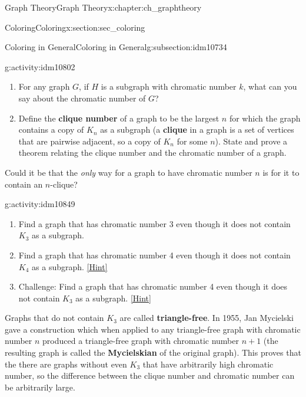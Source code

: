 \documentclass[oneside,10pt,]{book}
\newcommand{\terminology}[1]{\textbf{#1}}
\numberwithin{equation}{chapter}
\newcommand{\vtx}[2]{node[fill,circle,inner sep=0pt, minimum size=4pt,label=#1:#2]{}}
\renewcommand{\v}{\vtx{above}{}}
\begin{document}
\begin{chapterptx}{Graph Theory}{}{Graph Theory}{}{}{x:chapter:ch_graphtheory}
\begin{sectionptx}{Coloring}{}{Coloring}{}{}{x:section:sec_coloring}
\begin{subsectionptx}{Coloring in General}{}{Coloring in General}{}{}{g:subsection:idm10734}
\begin{activity}{}{g:activity:idm10802}
\begin{enumerate}[font=\bfseries,label=(\alph*),ref=\alph*]
\begin{sidebyside}{1}{0.375}{0.375}{0}
\begin{sbspanel}{0.25}
{
}%
\end{sbspanel}%
\end{sidebyside}%
\space\hspace*{0pt}\hfill{\tiny\hyperlink{g:hint:idm10809-back}{[Hint]}}\item{}For any graph \(G\), if \(H\) is a subgraph with chromatic number \(k\), what can you say about the chromatic number of \(G\)?%
\item{}Define the \terminology{clique number} of a graph to be the largest \(n\) for which the graph contains a copy of \(K_n\) as a subgraph (a \terminology{clique} in a graph is a set of vertices that are pairwise adjacent, so a copy of \(K_n\) for some \(n\)).  State and prove a theorem relating the clique number and the chromatic number of a graph.%
\end{enumerate}
\end{activity}
Could it be that the \emph{only} way for a graph to have chromatic number \(n\) is for it to contain an \(n\)-clique?%
\begin{activity}{}{g:activity:idm10849}%
\begin{enumerate}[font=\bfseries,label=(\alph*),ref=\alph*]
\item{}Find a graph that has chromatic number 3 even though it does not contain \(K_3\) as a subgraph.%
\item{}Find a graph that has chromatic number 4 even though it does not contain \(K_4\) as a subgraph.%
\space\hspace*{0pt}\hfill{\tiny\hyperlink{g:hint:idm10861-back}{[Hint]}}\item{}Challenge: Find a graph that has chromatic number 4 even though it does not contain \(K_3\) as a subgraph.%
\space\hspace*{0pt}\hfill{\tiny\hyperlink{g:hint:idm10875-back}{[Hint]}}\end{enumerate}
\end{activity}
Graphs that do not contain \(K_3\) are called \terminology{triangle-free}.  In 1955, Jan Mycielski gave a construction which when applied to any triangle-free graph with chromatic number \(n\) produced a triangle-free graph with chromatic number \(n+1\) (the resulting graph is called the \terminology{Mycielskian} of the original graph).  This proves that the there are graphs without even \(K_3\) that have arbitrarily high chromatic number, so the difference between the clique number and chromatic number can be arbitrarily large.%

\end{subsectionptx}
\end{sectionptx}
\end{chapterptx}
\end{document}
